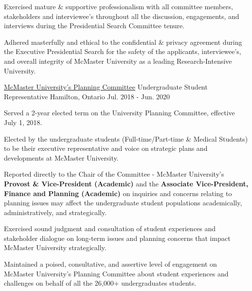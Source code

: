 \begin{cventries}
{\begin{cvitems}
        \item{Exercised mature \& supportive professionalism with all committee members, stakeholders and interviewee's throughout all the discussion, engagements, and interviews during the Presidential Search Committee tenure.}
        \item {Adhered masterfully and ethical to the confidential \& privacy agreement during the Executive Presidential Search for the safety of the applicants, interviewee's, and overall integrity of McMaster University as a leading Research-Intensive University.}
      \end{cvitems}
    }
\vspace{0.25cm}
  \cventry
   {\href{https://secretariat.mcmaster.ca/app/uploads/2019/01/2018-2019-UPC-membership-1.pdf}{McMaster University's Planning Committee}} %
    {Undergraduate Student Representative} %
    {Hamilton, Ontario} %
    {Jul. 2018 - Jun. 2020} %
     {\renewcommand{\labelitemii}{\bullet}
      \begin{cvitems}%
        \vspace{0.1cm}
                \item {Served a 2-year elected term on the University Planning Committee, effective July 1, 2018.}
                \item {Elected by the undergraduate students (Full-time/Part-time \& Medical Students) to be their executive representative and voice on \newline strategic plans and developments at McMaster University.}
                \item{Reported directly to the Chair of the Committee - McMaster University's\textbf{ Provost \& Vice-President (Academic)} and the \textbf{Associate Vice-President, Finance and Planning (Academic)} on inquiries and concerns relating to planning issues may affect the undergraduate student populations academically, administratively, and strategically.}
                \item{Exercised sound judgment and consultation of student experiences and stakeholder dialogue on long-term issues and planning concerns that impact McMaster University strategically.}
                \item {Maintained a poised, consultative, and assertive level of engagement on McMaster University's Planning Committee about student experiences and challenges on behalf of all the 26,000+ undergraduates students.}
      \end{cvitems}
    }



\end{cventries}
